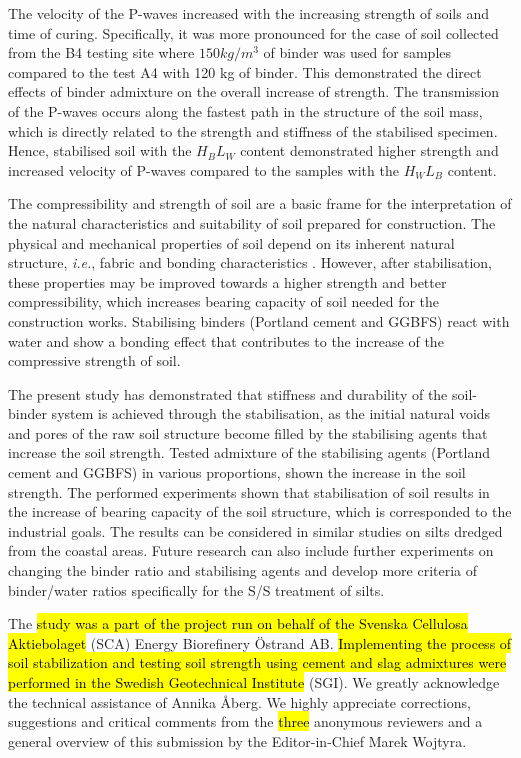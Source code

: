 \documentclass{amestyle}
\begin{document}
The velocity of the P-waves increased with the increasing strength of soils and time of curing. Specifically, it was more pronounced for the case of soil collected from the B4 testing site where $150 kg/m^3$ of binder was used for samples compared to the test A4 with 120 kg of binder. This demonstrated the direct effects of binder admixture on the overall increase of strength. The transmission of the P-waves occurs along the fastest path in the structure of the soil mass, which is directly related to the strength and stiffness of the stabilised specimen. Hence, stabilised soil with the $H_BL_W$ content demonstrated higher strength and increased velocity of P-waves compared to the samples with the $H_WL_B$  content.

The compressibility and strength of soil are a basic frame for the interpretation of the natural characteristics and suitability of soil prepared for construction. The physical and mechanical properties of soil depend on its inherent natural structure, \emph{i.e.}, fabric and bonding characteristics \cite{Burland}. However, after stabilisation, these properties may be improved towards a higher strength and better compressibility, which increases bearing capacity of soil needed for the construction works. Stabilising binders (Portland cement and GGBFS) react with water and show a bonding effect that contributes to the increase of the compressive strength of soil. 

The present study has demonstrated that stiffness and durability of the soil-binder system is achieved through the stabilisation, as the initial natural voids and pores of the raw soil structure become filled by the stabilising agents that increase the soil strength. Tested admixture of the stabilising agents (Portland cement and GGBFS) in various proportions, shown the increase in the soil strength. The performed experiments shown that stabilisation of soil results in the increase of bearing capacity of the soil structure, which is corresponded to the industrial goals. The results can be considered in similar studies on silts dredged from the coastal areas. Future research can also include further experiments on changing the binder ratio and stabilising agents and develop more criteria of binder/water ratios specifically for the S/S treatment of silts.

\begin{acknowledgements}
The \hl{study was a part of the project run on behalf of the Svenska Cellulosa Aktiebolaget} (SCA) Energy Biorefinery \"Ostrand AB. \hl{Implementing the process of soil stabilization and testing soil strength using cement and slag admixtures were performed in the Swedish Geotechnical Institute} (SGI).
We greatly acknowledge the technical assistance of Annika Åberg. We highly appreciate corrections, suggestions and critical comments from the \hl{three} anonymous reviewers and a general overview of this submission by the Editor-in-Chief Marek Wojtyra.
\end{acknowledgements}
\end{document}
